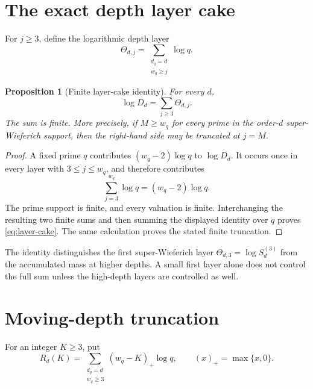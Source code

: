 \documentclass[11pt]{article}
\newtheorem{proposition}[theorem]{Proposition}
\theoremstyle{remark}
\begin{document}
\section{The exact depth layer cake}
\label{sec:layer-cake}

For $j\ge3$, define the logarithmic depth layer
\begin{equation}
  \Theta_{d,j}
   =\sum_{\substack{d_q=d\\w_q\ge j}}\log q.
  \label{eq:depth-layer}
\end{equation}

\begin{proposition}[Finite layer-cake identity]
\label{prop:layer-cake}
For every $d$,
\begin{equation}
                    \log D_d=\sum_{j\ge3}\Theta_{d,j}.
  \label{eq:layer-cake}
\end{equation}
The sum is finite.  More precisely, if $M\ge w_q$ for every prime in the
order-$d$ super-Wieferich support, then the right-hand side may be
truncated at $j=M$.
\end{proposition}

\begin{proof}
A fixed prime $q$ contributes $(w_q-2)\log q$ to $\log D_d$.  It occurs
once in every layer with $3\le j\le w_q$, and therefore contributes
\[
              \sum_{j=3}^{w_q}\log q=(w_q-2)\log q.
\]
The prime support is finite, and every valuation is finite.  Interchanging
the resulting two finite sums and then summing the displayed identity over
$q$ proves \eqref{eq:layer-cake}.  The same calculation proves the stated
finite truncation.
\end{proof}

The identity distinguishes the first super-Wieferich layer
$\Theta_{d,3}=\log S_d^{(3)}$ from the accumulated mass at higher depths.
A small first layer alone does not control the full sum unless the
high-depth layers are controlled as well.

\section{Moving-depth truncation}
\label{sec:truncation}

For an integer $K\ge3$, put
\begin{equation}
 R_d(K)=\sum_{\substack{d_q=d\\w_q\ge3}}
             (w_q-K)_+\log q,
 \qquad (x)_+=\max\{x,0\}.
 \label{eq:tail-definition}
\end{equation}
\end{document}
